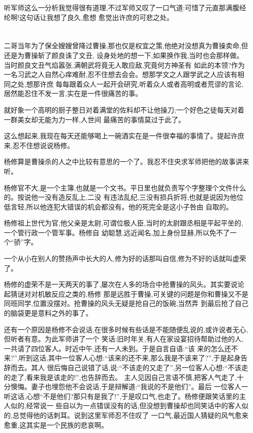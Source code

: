 ﻿\documentclass[12pt,twocolumn]{article}
\begin{document}
听军师这么一分析我觉得很有道理,不过军师又叹了一口气道:可惜了元直那满腹经纶啊!这句话让我想了良久,愈想
愈觉出许庶的可悲之处。

\section{}

二哥当年为了保全嫂嫂曾降过曹操,那也仅是权宜之策,他绝对没想真为曹操卖命,但还是为曹操斩了颜良诛了文丑,
设身处地的想一下,如果换作我,当时也会那样做。当时颜良文丑气焰嚣张,满朝武将竟无人敢应敌,究竟何方神圣有
如此的本领?作为一名习武之人自然心痒难耐,忍不住想去会会。想那学文之人跟学武之人应该有相同之处,想那许庶
每每跟着众人一起开会研究,听着众人或者高明或者荒谬的言论,居然能忍住不发一言,实在是一件很痛苦的事。

就好象一个高明的厨子整日对着满堂的佐料却不让他操刀;一个好色之徒每天对着一群美女却无能为力一样,人世间
最痛苦的事情莫过于此了。

这么想起来,我现在每天还能够喝上一碗酒实在是一件很幸福的事情了。提起许庶来,忍不住想说说杨修。

杨修算是曹操杀的人之中比较有意思的一个了。我忍不住央求军师把他的故事讲来听。

杨修官不大,是一个主簿,也就是一个文书。平日里也就负责写个字整理个文件什么的。按说他一没有造反乱上,二没
有违法乱纪,三没有损兵折将,也就是说因为他位低言轻,所以他连犯大错误的机会都没有。他的死完全是这小子咎由
自取的。

杨修祖上世代为官,他父亲是太尉,可谓位极人臣,当时的太尉跟丞相是平起平坐的,一个管行政一个管军事。杨修自
幼聪慧,远近闻名,加上身份显赫,所以免不了一个``骄''字。

一个从小在别人的赞扬声中长大的人,修为好的话那叫自信,修为不好的话就叫虚荣了。

杨修的虚荣不是一天两天的事了,屡次在人多的场合中抢曹操的风头。其实要说论起猜谜对对机敏反应之类的,杨修
那是远胜于曹操,可关键的问题是你和曹操又不是同班同学,位置没摆对。抢曹操的风头无疑是抢自己的饭碗,当然弄
到最后抢了自己的脑袋更是意料之外的事了。

还有一个原因是杨修不会说话,在很多时候有些话是不能随便乱说的,或许说者无心,但听者有意。为此军师讲了一个
笑话:旧时年关,有人在家设宴招待帮助过他的人,一共请了四位客人。时近中午,还有一人未到。于是自言自语:``该
来的怎么还不来?'',听到这话,其中一位客人心想:``该来的还不来,那么我是不该来了?'',于是起身告辞而去。其人
很后悔自己说错了话,说:``不该走的又走了'',另一位客人心想:``不该走的走了,看来我是该走的!'',也告辞而去。
主人见因自己言语不慎,把客人气走了,十分懊悔。妻子也埋怨他不会说话,于是辩解道:``我说的不是他们''。最后
一位客人一听这话,心想``不是他们?那只有是我了!'',于是叹口气,也走了。杨修便跟笑话里的主人似的,经常说一
些自以为一点错误没有的话,但没想到曹操却也同笑话中的客人似的,总觉得他的话刺耳。说到这里军师忍不住叹了
一口气,最近国人猜疑的风气愈来愈重,这其实是一个民族的悲哀啊。
\end{document}
